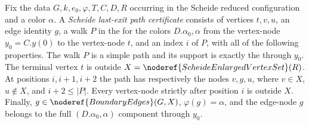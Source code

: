 \begin{definition}
Fix the data $G,k,e_0,\varphi,T,C,D,R$ occurring in the Scheide reduced
configuration and a color $\alpha$.  A \emph{Scheide last-exit path
certificate} consists of vertices $t,v,u$, an edge identity $g$, a walk
$P$ in the  for the colors
$D.\alpha_0,\alpha$ from the vertex-node $y_0=C.y(0)$ to the vertex-node
$t$, and an index $i$ of $P$, with all of the following properties.
The walk $P$ is a simple path and its support is exactly the
 through $y_0$.  The terminal vertex $t$ is
outside $X=\noderef{ScheideEnlargedVertexSet}(R)$.  At positions
$i,i+1,i+2$ the path has respectively the nodes $v,g,u$, where
$v\in X$, $u\notin X$, and $i+2\leq |P|$.  Every vertex-node strictly
after position $i$ is outside $X$.  Finally,
$g\in\noderef{BoundaryEdges}(G,X)$, $\varphi(g)=\alpha$, and the
edge-node $g$ belongs to the full $(D.\alpha_0,\alpha)$ component through
$y_0$.
\end{definition}
